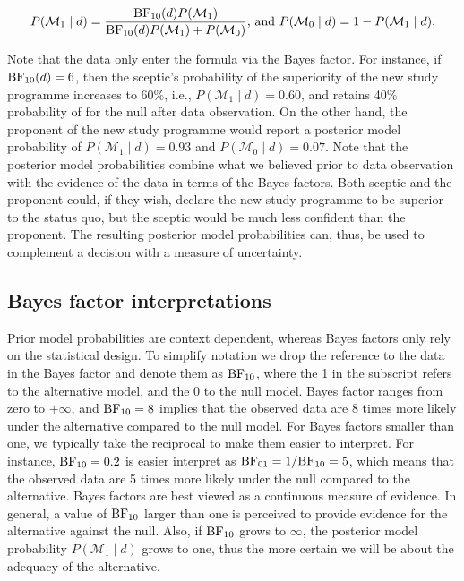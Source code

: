 \documentclass[english,,doc,floatsintext]{apa6}
\begin{document}
\begin{align}
\label{eqPriorToPosterior}
P(\mathcal{M}_{1} \mid d) = \frac{ \textnormal{BF}_{10}(d) P(\mathcal{M}_{1})}{\textnormal{BF}_{10}(d) P(\mathcal{M}_{1}) + P(\mathcal{M}_{0})} \text{, and } P(\mathcal{M}_{0} \mid d) = 1 - P(\mathcal{M}_{1} \mid d). 
\end{align}

Note that the data only enter the formula via the Bayes factor. For instance, if \(\textnormal{BF}_{10}(d) = 6\), then the sceptic's probability of the superiority of the new study programme increases to 60\%, i.e., \(P(\mathcal{M}_{1} \mid d)=0.60\), and retains 40\% probability of for the null after data observation. On the other hand, the proponent of the new study programme would report a posterior model probability of \(P(\mathcal{M}_{1} \mid d)=0.93\) and \(P(\mathcal{M}_{0} \mid d)=0.07\). Note that the posterior model probabilities combine what we believed prior to data observation with the evidence of the data in terms of the Bayes factors. Both sceptic and the proponent could, if they wish, declare the new study programme to be superior to the status quo, but the sceptic would be much less confident than the proponent. The resulting posterior model probabilities can, thus, be used to complement a decision with a measure of uncertainty.

\hypertarget{bayes-factor-interpretations}{%
\subsection{Bayes factor interpretations}\label{bayes-factor-interpretations}}

Prior model probabilities are context dependent, whereas Bayes factors only rely on the statistical design. To simplify notation we drop the reference to the data in the Bayes factor and denote them as \(\textnormal{BF}_{10}\), where the 1 in the subscript refers to the alternative model, and the 0 to the null model. Bayes factor ranges from zero to \(+ \infty\), and \(\textnormal{BF}_{10} = 8\) implies that the observed data are 8 times more likely under the alternative compared to the null model. For Bayes factors smaller than one, we typically take the reciprocal to make them easier to interpret. For instance, \(\textnormal{BF}_{10} = 0.2\) is easier interpret as \(\textnormal{BF}_{01} = 1/\textnormal{BF}_{10} = 5\), which means that the observed data are 5 times more likely under the null compared to the alternative. Bayes factors are best viewed as a continuous measure of evidence. In general, a value of \(\textnormal{BF}_{10}\) larger than one is perceived to provide evidence for the alternative against the null. Also, if \(\textnormal{BF}_{10}\) grows to \(\infty\), the posterior model probability \(P(\mathcal{M}_{1} \mid d)\) grows to one, thus the more certain we will be about the adequacy of the alternative.
\end{document}

